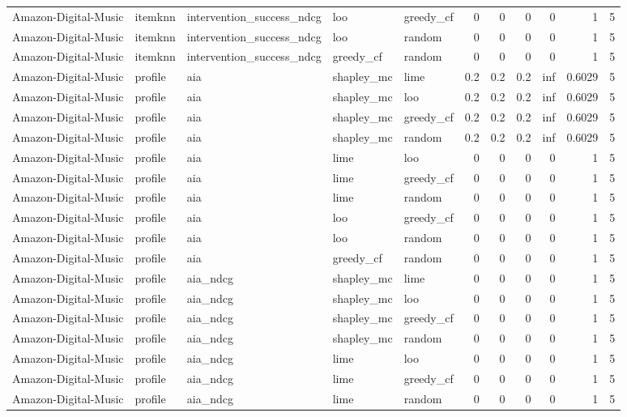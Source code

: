 \begin{table}[t]
{\begin{tabular}{lllllrrrrrr}
Amazon-Digital-Music & itemknn & intervention\_success\_ndcg & loo & greedy\_cf & 0 & 0 & 0 & 0 & 1 & 5 \\
Amazon-Digital-Music & itemknn & intervention\_success\_ndcg & loo & random & 0 & 0 & 0 & 0 & 1 & 5 \\
Amazon-Digital-Music & itemknn & intervention\_success\_ndcg & greedy\_cf & random & 0 & 0 & 0 & 0 & 1 & 5 \\
Amazon-Digital-Music & profile & aia & shapley\_mc & lime & 0.2 & 0.2 & 0.2 & inf & 0.6029 & 5 \\
Amazon-Digital-Music & profile & aia & shapley\_mc & loo & 0.2 & 0.2 & 0.2 & inf & 0.6029 & 5 \\
Amazon-Digital-Music & profile & aia & shapley\_mc & greedy\_cf & 0.2 & 0.2 & 0.2 & inf & 0.6029 & 5 \\
Amazon-Digital-Music & profile & aia & shapley\_mc & random & 0.2 & 0.2 & 0.2 & inf & 0.6029 & 5 \\
Amazon-Digital-Music & profile & aia & lime & loo & 0 & 0 & 0 & 0 & 1 & 5 \\
Amazon-Digital-Music & profile & aia & lime & greedy\_cf & 0 & 0 & 0 & 0 & 1 & 5 \\
Amazon-Digital-Music & profile & aia & lime & random & 0 & 0 & 0 & 0 & 1 & 5 \\
Amazon-Digital-Music & profile & aia & loo & greedy\_cf & 0 & 0 & 0 & 0 & 1 & 5 \\
Amazon-Digital-Music & profile & aia & loo & random & 0 & 0 & 0 & 0 & 1 & 5 \\
Amazon-Digital-Music & profile & aia & greedy\_cf & random & 0 & 0 & 0 & 0 & 1 & 5 \\
Amazon-Digital-Music & profile & aia\_ndcg & shapley\_mc & lime & 0 & 0 & 0 & 0 & 1 & 5 \\
Amazon-Digital-Music & profile & aia\_ndcg & shapley\_mc & loo & 0 & 0 & 0 & 0 & 1 & 5 \\
Amazon-Digital-Music & profile & aia\_ndcg & shapley\_mc & greedy\_cf & 0 & 0 & 0 & 0 & 1 & 5 \\
Amazon-Digital-Music & profile & aia\_ndcg & shapley\_mc & random & 0 & 0 & 0 & 0 & 1 & 5 \\
Amazon-Digital-Music & profile & aia\_ndcg & lime & loo & 0 & 0 & 0 & 0 & 1 & 5 \\
Amazon-Digital-Music & profile & aia\_ndcg & lime & greedy\_cf & 0 & 0 & 0 & 0 & 1 & 5 \\
Amazon-Digital-Music & profile & aia\_ndcg & lime & random & 0 & 0 & 0 & 0 & 1 & 5 \\

\end{tabular}}
\end{table}
